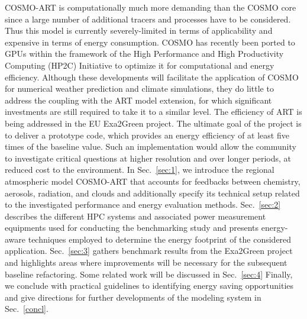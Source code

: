 COSMO-ART is  computationally much more demanding than  the COSMO core
since a  large number of additional  tracers and processes  have to be
considered.  Thus this model is currently severely-limited in terms of
applicability and expensive in terms of energy consumption.  COSMO has
recently  been  ported  to  GPUs  within the  framework  of  the  High
Performance  and  High  Productivity  Computing (HP2C)  Initiative  to
optimize it  for computational and energy  efficiency.  Although these
developments will  facilitate the  application of COSMO  for numerical
weather prediction and climate  simulations, they do little to address
the  coupling with  the  ART model  extension,  for which  significant
investments  are still required  to take  it to  a similar  level. The
efficiency of ART is being  addressed in the EU Exa2Green project. The
ultimate goal  of the  project is to  deliver a prototype  code, which
provides an energy  efficiency of at least five  times of the baseline
value.   Such   an  implementation   would  allow  the   community  to
investigate critical  questions at  higher resolution and  over longer
periods, at reduced cost  to the environment.  In Sec.~\ref{sec:1}, we
introduce the regional  atmospheric model COSMO-ART \citep{Vogel-2009}
that  accounts for feedbacks  between chemistry,  aerosols, radiation,
and clouds and additionally specify its technical setup related to the
investigated    performance    and     energy    evaluation    methods.
Sec.~\ref{sec:2}  describes the different  HPC systems  and associated
power  measurement  equipments used  for  conducting the  benchmarking
study and  presents energy-aware techniques employed  to determine the
energy  footprint  of  the considered  application.   Sec.~\ref{sec:3}
gathers benchmark  results from  the Exa2Green project  and highlights
areas where improvements will be necessary for the subsequent baseline
refactoring.  Some related work  will be discussed in Sec.~\ref{sec:4}
Finally, we  conclude with practical guidelines  to identifying energy
saving opportunities  and give directions for  further developments of
the modeling system in Sec.~\ref{concl}.

